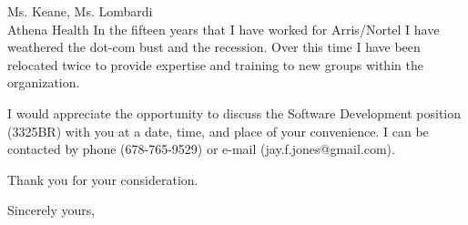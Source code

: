 \documentclass{letter} %
\begin{document}
\begin{letter}{Ms. Keane, Ms. Lombardi\\
Athena Health
}
In the fifteen years that I have worked for Arris/Nortel I have weathered 
the dot-com bust and the recession.  Over this time I have been relocated twice 
to provide expertise and training to new groups within the organization. 
 
\noindent I would appreciate the opportunity to discuss the Software 
Development position (3325BR) with you at a date, time, and place of your
convenience. I can be contacted by phone (678-765-9529) or e-mail (jay.f.jones@gmail.com).

\noident Thank you for your consideration.
 
\closing{Sincerely yours,} 


 

\end{letter}
 
\end{document}
